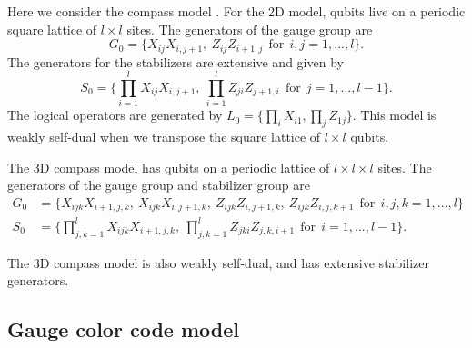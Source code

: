 \documentclass[a4paper,onecolumn,11pt,unpublished]{quantumarticle}
\def\Stab{S}
\begin{document}
Here we consider the compass model \cite{Bacon2006}.
For the 2D model,
qubits live on a periodic square lattice of $l\times l$ sites.
The generators of the gauge group are
$$
    G_0 = \big\{ X_{ij}X_{i,j+1},\ Z_{ij}Z_{i+1,j}\ \
        \mbox{for}\ \ i,j = 1,...,l\big\}.
$$
The generators for the stabilizers are
extensive and given by
$$
    \Stab_0 = \Big\{ \prod_{i=1}^l X_{ij}X_{i,j+1},\ \prod_{i=1}^l Z_{ji}Z_{j+1,i}
        \ \ \mbox{for}\ \ j=1,...,l-1\Big\}.
$$
The logical operators are generated by 
$L_0 = \big\{ \prod_i X_{i1}, \prod_j Z_{1j} \big\}.$
This model is weakly self-dual when we transpose
the square lattice of $l\times l$ qubits.

The 3D compass model has qubits on a periodic lattice of $l\times l\times l$
sites.
The generators of the gauge group and stabilizer group are
\begin{align*}
    G_0 &= \big\{ 
        X_{ijk}X_{i+1,j,k},\ 
        X_{ijk}X_{i,j+1,k},\ 
        Z_{ijk}Z_{i,j+1,k},\ 
        Z_{ijk}Z_{i,j,k+1}\ 
        \ \mbox{for}\ \ i, j, k = 1,...,l\big\}\\
    \Stab_0 &= \Big\{ 
        \prod_{j,k=1}^l X_{ijk}X_{i+1,j,k},\ 
        \prod_{j,k=1}^l Z_{jki}Z_{j,k,i+1}\ \ 
            \mbox{for}\ \ i=1,...,l-1\Big\}.
\end{align*}

The 3D compass model is also weakly self-dual,
and has extensive stabilizer generators.

\subsection{Gauge color code model}\label{Sec44}
\end{document}
